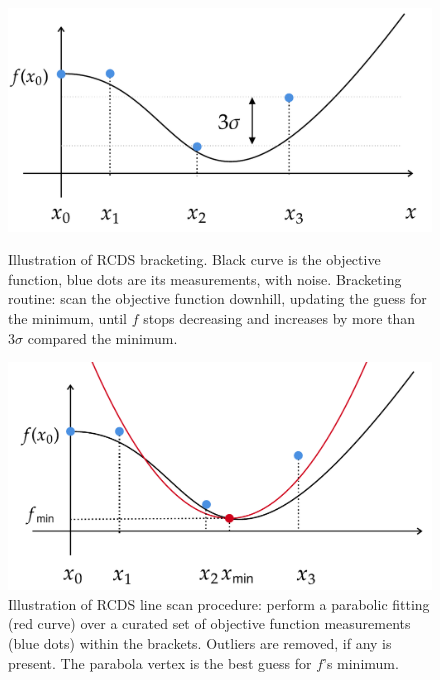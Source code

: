 \begin{figure}
    \begin{minipage}{0.48\textwidth}
        \centering
        \includegraphics[width=\textwidth]{Images/bracketing.pdf}
        \caption[Illustration of RCDS bracketing.]{Illustration of RCDS bracketing. Black curve is the objective function, blue dots are its measurements, with noise. Bracketing routine: scan the objective function downhill, updating the guess for the minimum, until $f$ stops decreasing and increases by more than $3\sigma$ compared the minimum.}
        \label{fig:bracketing}
    \end{minipage}
    \hfill
    \begin{minipage}{0.48\textwidth}
        \centering
        \includegraphics[width=\textwidth]{Images/linescan.pdf}
        \caption[Illustration of RCDS line scan procedure.]{Illustration of RCDS line scan procedure: perform a parabolic fitting (red curve) over a curated set of objective function measurements (blue dots) within the brackets. Outliers are removed, if any is present. The parabola vertex is the best guess for $f$'s minimum.}
    \end{minipage}
\end{figure}
